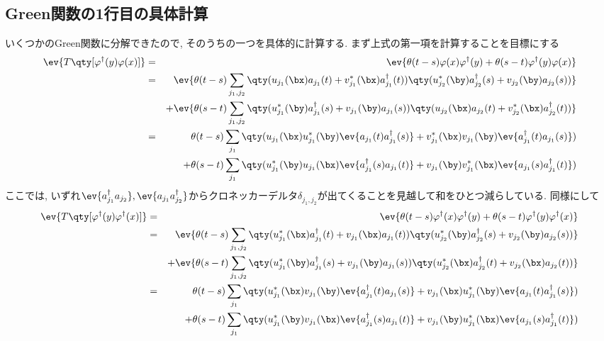 \documentclass[10.5pt,a4paper]{jreport}
\begin{document}
\subsection{Green関数の1行目の具体計算}
いくつかのGreen関数に分解できたので, そのうちの一つを具体的に計算する. まず上式の第一項を計算することを目標にする
\begin{eqnarray}
  \ev{T\qty[\varphi^\dagger(y)\varphi(x)]} &=&\ev{\theta(t-s)\varphi(x)\varphi^\dagger(y)+\theta(s-t)\varphi^\dagger(y)\varphi(x)}\\
  \nonumber  &=&\ev{\theta(t-s)\sum_{j_1, j_2}\qty(u_{j_1}(\bx)a_{j_1}(t) + v_{j_1}^*(\bx)a_{j_1}^\dagger(t))\qty(u_{j_2}^*(\by)a_{j_2}^\dagger(s) + v_{j_2}(\by)a_{j_2}(s))}\\
  \nonumber  &&+ \ev{\theta(s-t)\sum_{j_1, j_2}\qty(u_{j_1}^*(\by)a_{j_1}^\dagger(s) + v_{j_1}(\by)a_{j_1}(s))\qty(u_{j_2}(\bx)a_{j_2}(t) + v^*_{j_2}(\bx)a^\dagger_{j_2}(t))}\\
  \nonumber&=&\theta(t-s)\sum_{j_1}\qty(u_{j_1}(\bx)u_{j_1}^*(\by)\ev{a_{j_1}(t)a_{j_1}^\dagger(s)} + v_{j_1}^*(\bx)v_{j_1}(\by)\ev{a_{j_1}^\dagger(t)a_{j_1}(s)})\\
  &&+\theta(s-t)\sum_{j_1}\qty(u_{j_1}^*(\by)u_{j_1}(\bx)\ev{a_{j_1}^\dagger(s)a_{j_1}(t)} + v_{j_1}(\by)v_{j_1}^*(\bx)\ev{a_{j_1}(s)a_{j_1}^\dagger(t)})
\end{eqnarray}
ここでは, いずれ$\ev{a_{j_1}^\dagger a_{j_2}}, \ev{a_{j_1} a_{j_2}^\dagger}$からクロネッカーデルタ$\delta_{j_1, j_2}$が出てくることを見越して和をひとつ減らしている. 同様にして
\begin{eqnarray}
  \ev{T\qty[\varphi^\dagger(y)\varphi^\dagger(x)]} &=&\ev{\theta(t-s)\varphi^\dagger(x)\varphi^\dagger(y)+\theta(s-t)\varphi^\dagger(y)\varphi^\dagger(x)}\\
  \nonumber  &=&\ev{\theta(t-s)\sum_{j_1, j_2}\qty(u^*_{j_1}(\bx)a^\dagger_{j_1}(t) + v_{j_1}(\bx)a_{j_1}(t))\qty(u_{j_2}^*(\by)a_{j_2}^\dagger(s) + v_{j_2}(\by)a_{j_2}(s))}\\
  \nonumber  &&+ \ev{\theta(s-t)\sum_{j_1, j_2}\qty(u_{j_1}^*(\by)a_{j_1}^\dagger(s) + v_{j_1}(\by)a_{j_1}(s))\qty(u^*_{j_2}(\bx)a^\dagger_{j_2}(t) + v_{j_2}(\bx)a_{j_2}(t))}\\
  \nonumber&=& \theta(t-s)\sum_{j_1}\qty(u^*_{j_1}(\bx)v_{j_1}(\by)\ev{a_{j_1}^\dagger(t)a_{j_1}(s)} + v_{j_1}(\bx)u^*_{j_1}(\by)\ev{a_{j_1}(t)a_{j_1}^\dagger(s)})\\
  &&+\theta(s-t)\sum_{j_1}\qty(u^*_{j_1}(\by)v_{j_1}(\bx)\ev{a_{j_1}^\dagger(s)a_{j_1}(t)} + v_{j_1}(\by)u^*_{j_1}(\bx)\ev{a_{j_1}(s)a_{j_1}^\dagger(t)})
\end{eqnarray}
\end{document}
